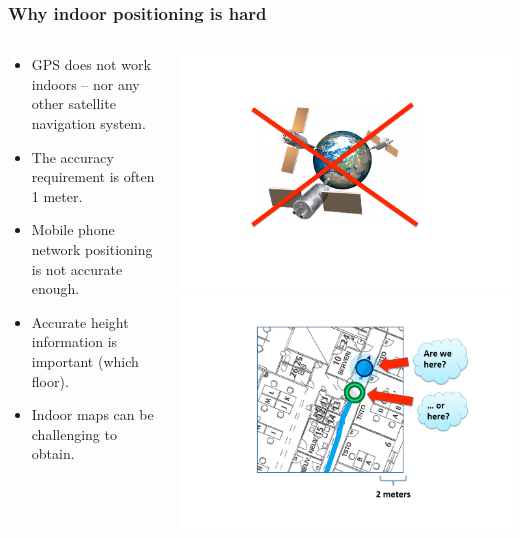\documentclass[xcolor=svgnames,english,presentation]{beamer}
\begin{document}
\begin{frame}
  \frametitle{Why indoor positioning is hard}

  \begin{columns}
  \begin{column}{0.7\textwidth}
  \begin{itemize}[<+->]       
  \item \alert{GPS does not work indoors} -- nor any other satellite navigation system.
  \item The \alert{accuracy requirement} is often \alert{1 meter}.
  \item \alert{Mobile phone network} positioning is not accurate enough.
  \item Accurate \alert{height} information is important (which floor).
  \item \alert{Indoor maps} can be challenging to obtain.
  \end{itemize}
  \end{column}
  \begin{column}{0.3\textwidth}
  \includegraphics[width=\columnwidth]{nogps} \\
  \includegraphics[width=\columnwidth]{accuracy} \\

\end{column}
\end{columns}
\end{frame}
\end{document}
